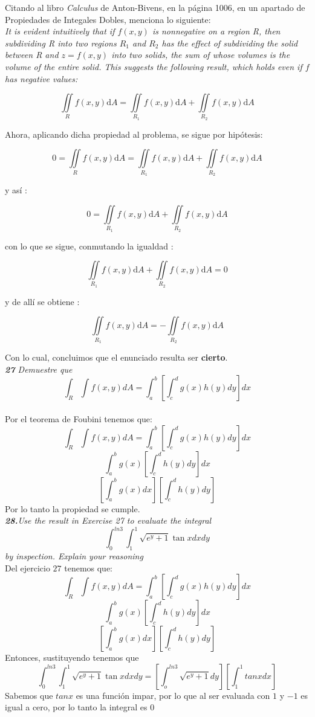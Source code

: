 \documentclass[a4paper,12pt]{article}
\begin{document}
	Citando al libro \textit{Calculus} de Anton-Bivens, en la página 1006, en un
	apartado de Propiedades de Integales Dobles, menciona lo siguiente:\\

	\textit{It is evident intuitively that if $f(x, y)$ is nonnegative on a
	region R, then subdividing R into two regions $R_1$ and $R_2$ has the effect
	of subdividing the solid between R and $z = f (x , y)$ into two solids,
	the sum of whose volumes is the volume of the entire solid. This suggests
	the following result, which holds even if $f$ has negative values:}

		$$ \iint\limits_{R} f(x,y)\mathrm{d}A
			= \iint\limits_{R_1} f(x,y)\mathrm{d}A + \iint\limits_{R_2} f(x,y)\mathrm{d}A  $$

	Ahora, aplicando dicha propiedad al problema, se sigue por hipótesis:

		$$ 0 = \iint\limits_{R} f(x,y)\mathrm{d}A
			= \iint\limits_{R_1} f(x,y)\mathrm{d}A + \iint\limits_{R_2} f(x,y)\mathrm{d}A  $$

	y así :

		$$ 0 = \iint\limits_{R_1} f(x,y)\mathrm{d}A + \iint\limits_{R_2} f(x,y)\mathrm{d}A  $$

	con lo que se sigue, conmutando la igualdad :

		$$ \iint\limits_{R_1} f(x,y)\mathrm{d}A + \iint\limits_{R_2} f(x,y)\mathrm{d}A = 0$$

	y de allí se obtiene :

		$$ \iint\limits_{R_1} f(x,y)\mathrm{d}A = - \iint\limits_{R_2} f(x,y)\mathrm{d}A $$

	Con lo cual, concluimos que el enunciado resulta ser \textbf{cierto}.\\

	\textit{\textbf{27} Demuestre que \[\int_{R}\int f(x,y)dA = \int_a^b[\int_c^dg(x)h(y)dy]dx\]}\\
	Por el teorema de Foubini tenemos que:
	\[\int_{R}\int f(x,y)dA = \int_a^b[\int_c^dg(x)h(y)dy]dx\]
	\[\int_a^b g(x)[\int_c^dh(y)dy ]dx\]
	\[[\int_a^b g(x) dx][\int_c^d h(y) dy]\]
	Por lo tanto la propiedad se cumple.\\
	\textit{\textbf{28.}Use the result in Exercise 27 to evaluate the integral
\[\int^{ln 3}_{0} \int_1 ^1 \sqrt{e^y + 1}\tan x dx dy\] by inspection. Explain your reasoning}\\

Del ejercicio $27$ tenemos que:
\[\int_{R}\int f(x,y)dA = \int_a^b[\int_c^dg(x)h(y)dy]dx\]
\[\int_a^b g(x)[\int_c^dh(y)dy ]dx\]
\[[\int_a^b g(x) dx][\int_c^d h(y) dy]\]
Entonces, sustituyendo tenemos que
\[\int^{ln 3}_{0} \int_1 ^1 \sqrt{e^y + 1}\tan x dx dy=[\int_o^{ln3} \sqrt{e^y + 1}dy][\int_1^1tan x dx]\]
Sabemos que $tan x$ es una función impar, por lo que al ser evaluada con $1$ y $-1$ es igual a cero, por lo tanto la integral es $0$\
\end{document}
